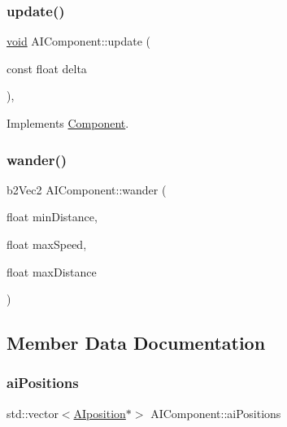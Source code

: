 \mbox{\label{classAIComponent_a456939f85de6d6cfc3e4e48ffc9f568c}} 
\subsubsection{\texorpdfstring{update()}{update()}}
{\footnotesize\ttfamily \hyperlink{imgui__impl__opengl3__loader_8h_ac668e7cffd9e2e9cfee428b9b2f34fa7}{void} A\+I\+Component\+::update (\begin{DoxyParamCaption}\item[{const float}]{delta }\end{DoxyParamCaption})\hspace{0.3cm}{\ttfamily [override]}, {\ttfamily [virtual]}}



Implements \hyperlink{classComponent_a3448977e6f464df89e77dda7c6f52204}{Component}.

\mbox{\label{classAIComponent_aee1af922a048c44f48cb204d8e153fb5}} 
\subsubsection{\texorpdfstring{wander()}{wander()}}
{\footnotesize\ttfamily b2\+Vec2 A\+I\+Component\+::wander (\begin{DoxyParamCaption}\item[{float}]{min\+Distance,  }\item[{float}]{max\+Speed,  }\item[{float}]{max\+Distance }\end{DoxyParamCaption})}



\subsection{Member Data Documentation}
\mbox{\label{classAIComponent_a016b40f3b9d332294a517cbcc28ddcc9}} 
\subsubsection{\texorpdfstring{ai\+Positions}{aiPositions}}
{\footnotesize\ttfamily std\+::vector$<$\hyperlink{structAIposition}{A\+Iposition}$\ast$$>$ A\+I\+Component\+::ai\+Positions\hspace{0.3cm}{\ttfamily [private]}}

